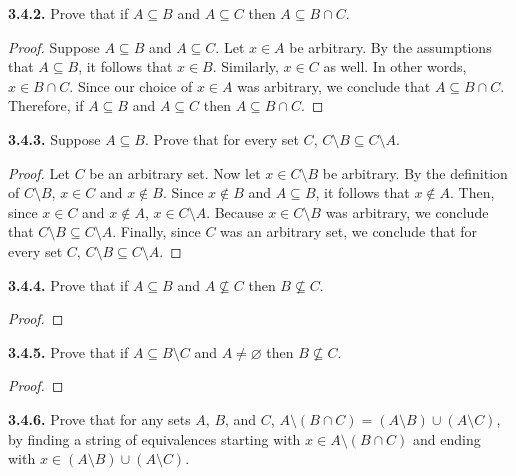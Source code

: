 \documentclass[12pt]{amsart}
\newenvironment{statement}[1]{\smallskip\noindent\color[rgb]{.6627, .3529, .6314} {\bf #1.}}{}
\theoremstyle{definition}
\theoremstyle{remark}
\begin{document}
\begin{statement}{3.4.2}
Prove that if $A \subseteq B$ and $A \subseteq C$ then $A \subseteq B \cap C$.
\end{statement}

\begin{proof}
Suppose $A \subseteq B$ and $A \subseteq C$.
Let $x \in A$ be arbitrary.
By the assumptions that $A \subseteq B$, it follows that $x \in B$.
Similarly, $x \in C$ as well.
In other words, $x \in B \cap C$.
Since our choice of $x \in A$ was arbitrary, we conclude that $A \subseteq B \cap C$.
Therefore, if $A \subseteq B$ and $A \subseteq C$ then $A \subseteq B \cap C$.
\end{proof}


\begin{statement}{3.4.3}
Suppose $A \subseteq B$.
Prove that for every set $C$, $C \setminus B \subseteq C \setminus A$.
\end{statement}

\begin{proof}
Let $C$ be an arbitrary set.
Now let $x \in C \setminus B$ be arbitrary.
By the definition of $C \setminus B$, $x \in C$ and $x \notin B$.
Since $x \notin B$ and $A \subseteq B$, it follows that $x \notin A$.
Then, since $x \in C$ and $x \notin A$, $x \in C \setminus A$.
Because $x \in C \setminus B$ was arbitrary, we conclude that $C \setminus B \subseteq C \setminus A$.
Finally, since $C$ was an arbitrary set, we conclude that for every set $C$, $C \setminus B \subseteq C \setminus A$.
\end{proof}


\begin{statement}{3.4.4}
Prove that if $A \subseteq B$ and $A \nsubseteq C$ then $B \nsubseteq C$.
\end{statement}

\begin{proof}
\end{proof}


\begin{statement}{3.4.5}
Prove that if $A \subseteq B \setminus C$ and $A \neq \varnothing$ then $B \nsubseteq C$.
\end{statement}

\begin{proof}
\end{proof}


\begin{statement}{3.4.6}
Prove that for any sets $A$, $B$, and $C$, $A \setminus (B \cap C) = (A \setminus B) \cup (A \setminus C)$, by finding a string of equivalences starting with $x \in A \setminus (B \cap C)$ and ending with $x \in (A \setminus B) \cup (A \setminus C)$.
\end{statement}
\end{document}
